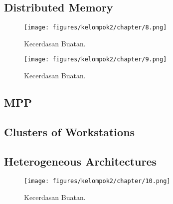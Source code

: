 \subsection{Distributed Memory}

\begin{figure}[H]
	\texttt{[image: figures/kelompok2/chapter/8.png]}
	\centering
	\caption{Kecerdasan Buatan.}
\end{figure}

\begin{figure}[H]
	\texttt{[image: figures/kelompok2/chapter/9.png]}
	\centering
	\caption{Kecerdasan Buatan.}
\end{figure}

\subsection{MPP}

\subsection{Clusters of Workstations}

\subsection{Heterogeneous Architectures}

\begin{figure}[H]
	\texttt{[image: figures/kelompok2/chapter/10.png]}
	\centering
	\caption{Kecerdasan Buatan.}
\end{figure}